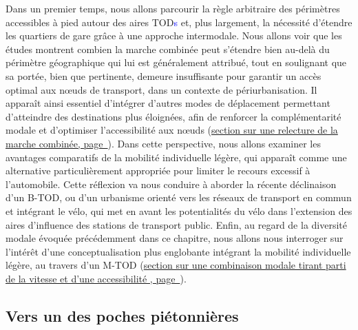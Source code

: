 \begin{refsegment}
Dans un premier temps, nous allons parcourir la règle arbitraire des périmètres accessibles à pied autour des aires \acrshort{TOD}\textcolor{blue}{s} et, plus largement, la nécessité d’étendre les quartiers de gare grâce à une approche intermodale. Nous allons voir que les études montrent combien la marche combinée peut s’étendre bien au-delà du périmètre géographique qui lui est généralement attribué, tout en soulignant que sa portée, bien que pertinente, demeure insuffisante pour garantir un accès optimal aux nœuds de transport, dans un contexte de périurbanisation. Il apparaît ainsi essentiel d’intégrer d’autres modes de déplacement permettant d’atteindre des destinations plus éloignées, afin de renforcer la complémentarité modale et d’optimiser l’accessibilité aux nœuds (\hyperref[chap1:btod-limites-tod]{section sur une relecture de la marche combinée, page~\pageref{chap1:btod-limites-tod}}). Dans cette perspective, nous allons examiner les avantages comparatifs de la mobilité individuelle légère, qui apparaît comme une alternative particulièrement appropriée pour limiter le recours excessif à l’automobile. Cette réflexion va nous conduire à aborder la récente déclinaison d'un \acrfull{B-TOD}, ou d'un urbanisme orienté vers les réseaux de transport en commun et intégrant le vélo, qui met en avant les potentialités du vélo dans l’extension des aires d’influence des stations de transport public. Enfin, au regard de la diversité modale évoquée précédemment dans ce chapitre, nous allons nous interroger sur l'intérêt d'une conceptualisation plus englobante intégrant la mobilité individuelle légère, au travers d’un \acrfull{M-TOD} (\hyperref[chap1:btod-definition]{section sur une combinaison modale tirant parti de la vitesse et d'une accessibilité , page~\pageref{chap1:btod-definition}}).%

\subsection{Vers un  des poches piétonnières
    \label{chap1:btod-limites-tod}
    }


\end{refsegment}
